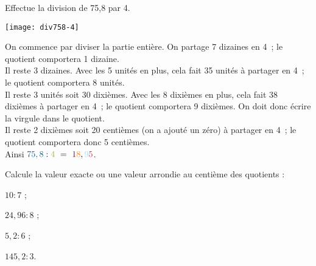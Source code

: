 
\begin{methode*1}

\begin{exemple*1}
Effectue la division de 75,8 par 4.\\[0.5em]

\begin{minipage}[c]{.26\textwidth}
\vspace{0em}
\begin{center}\texttt{[image: div758-4]} \end{center}

\end{minipage}\hfill%
\begin{minipage}[c]{.66\textwidth}

On commence par diviser la partie entière. On partage \textcolor{A1}{7} dizaines en \textcolor{H1}{4} ; le quotient comportera \textcolor{C1}{1} dizaine.\\[0.75em]
Il reste 3 dizaines. Avec les \textcolor{A1}{5} unités en plus, cela fait 35 unités à partager en \textcolor{H1}{4} ; le quotient comportera \textcolor{J1}{8} unités. \\[0.75em]
Il reste 3 unités soit 30 dixièmes. Avec les \textcolor{A1}{8} dixièmes en plus, cela fait 38 dixièmes à partager en \textcolor{H1}{4} ; le quotient comportera \textcolor{A3}{9} dixièmes. On doit donc écrire la virgule dans le quotient.\\[0.75em]
Il reste 2 dixièmes soit 20 centièmes (on a ajouté un zéro) à partager en \textcolor{H1}{4} ; le quotient comportera donc \textcolor{B2}{5} centièmes.\\[0.75em]
Ainsi $\textcolor{A1}{75,8} : \textcolor{H1}{4} = \textcolor{C1}{1}\textcolor{J1}{8},\textcolor{A3}{9}\textcolor{B2}{5}$.
\end{minipage}

\end{exemple*1}

\exercice

Calcule la valeur exacte ou une valeur arrondie au centième des quotients :
\begin{colenumerate}{4}
 \item $10 : 7$ ;
 \item $24,96 : 8$ ;
 \item $5,2 : 6$ ;
 \item $145,2 : 3$.
 \end{colenumerate}

\end{methode*1}

